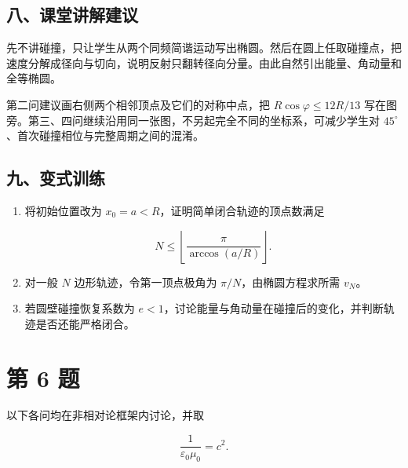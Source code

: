 \documentclass[12pt,a4paper,UTF8]{ctexart}
\begin{document}
\subsection{八、课堂讲解建议}\label{ux516bux8bfeux5802ux8bb2ux89e3ux5efaux8bae-4}

先不讲碰撞，只让学生从两个同频简谐运动写出椭圆。然后在圆上任取碰撞点，把速度分解成径向与切向，说明反射只翻转径向分量。由此自然引出能量、角动量和全等椭圆。

第二问建议画右侧两个相邻顶点及它们的对称中点，把
\(R\cos\varphi\le12R/13\)
写在图旁。第三、四问继续沿用同一张图，不另起完全不同的坐标系，可减少学生对
\(45^\circ\)、首次碰撞相位与完整周期之间的混淆。

\subsection{九、变式训练}\label{ux4e5dux53d8ux5f0fux8badux7ec3-4}

\begin{enumerate}
\def\labelenumi{\arabic{enumi}.}
\item
  将初始位置改为 \(x_0=a<R\)，证明简单闭合轨迹的顶点数满足

  \[N\le\left\lfloor\frac{\pi}{\arccos(a/R)}\right\rfloor.\]
\item
  对一般 \(N\) 边形轨迹，令第一顶点极角为 \(\pi/N\)，由椭圆方程求所需
  \(v_N\)。
\item
  若圆壁碰撞恢复系数为
  \(e<1\)，讨论能量与角动量在碰撞后的变化，并判断轨迹是否还能严格闭合。
\end{enumerate}

\newpage

\section{第 6 题}\label{ux7b2c-6-ux9898}

以下各问均在非相对论框架内讨论，并取

\[\frac{1}{\varepsilon_0\mu_0}=c^2.\]
\end{document}
